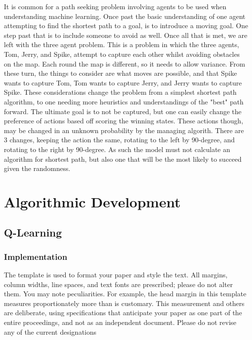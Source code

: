 \documentclass[letterpaper, 10 pt, conference]{ieeeconf}   %
\begin{document}
It is common for a path seeking problem involving agents to be used when understanding machine learning. Once past the basic understanding of one agent attempting
to find the shortest path to a goal, is to introduce a moving goal. One step past that is to include someone to avoid as well. Once all that is met, we are left with the three agent problem. This
is a problem in which the three agents, Tom, Jerry, and Spike, attempt to capture each other whilst avoiding obstacles on the map. Each round the map is different, so it needs to allow variance.
From these turn, the things to consider are what moves are possible, and that Spike wants to capture Tom, Tom wants to capture Jerry, and Jerry wants to capture Spike. These considerations
change the problem from a simplest shortest path algorithm, to one needing more heuristics and understandings of the "best" path forward. The ultimate goal is to not be captured,
but one can easily change the preference of actions based off scoring the winning states. These actions though, may be changed in an unknown probability by the managing algorith.
There are 3 changes, keeping the action the same, rotating to the left by 90-degree, and rotating to the right by 90-degree. As such the model must not calculate
an algorithm for shortest path, but also one that will be the most likely to succeed given the randomness.

\section{Algorithmic Development}

\subsection{Q-Learning}

\subsubsection{Implementation}

The template is used to format your paper and style the text. All margins, column widths, line spaces, and text fonts are prescribed; please do not alter them. You may note peculiarities. For example, the head margin in this template measures proportionately more than is customary. This measurement and others are deliberate, using specifications that anticipate your paper as one part of the entire proceedings, and not as an independent document. Please do not revise any of the current designations
\end{document}
